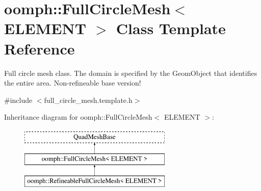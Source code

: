 \hypertarget{classoomph_1_1FullCircleMesh}{}\section{oomph\+:\+:Full\+Circle\+Mesh$<$ E\+L\+E\+M\+E\+NT $>$ Class Template Reference}
\label{classoomph_1_1FullCircleMesh}


Full circle mesh class. The domain is specified by the Geom\+Object that identifies the entire area. Non-\/refineable base version!  




{\ttfamily \#include $<$full\+\_\+circle\+\_\+mesh.\+template.\+h$>$}

Inheritance diagram for oomph\+:\+:Full\+Circle\+Mesh$<$ E\+L\+E\+M\+E\+NT $>$\+:\begin{figure}[H]
\begin{center}
\leavevmode
\includegraphics[height=3.000000cm]{classoomph_1_1FullCircleMesh}
\end{center}
\end{figure}
